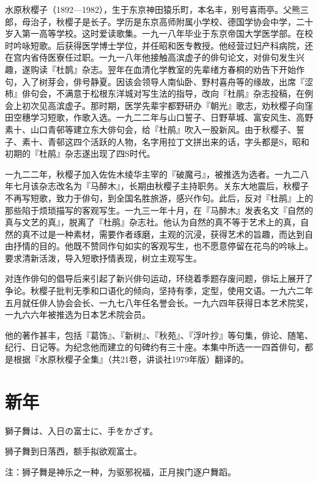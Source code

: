 {\FS
    水原秋樱子（1892—1982），生于东京神田猿乐町，本名丰，别号喜雨亭。父熊三郎，母治子，秋樱子是长子。学历是东京高师附属小学校、德国学协会中学，二十岁入第一高等学校。这时爱读歌集。一九一八年毕业于东京帝国大学医学部。在校时吟咏短歌。后获得医学博士学位，并任昭和医专教授。他经营过妇产科病院，还在宫内省侍医寮任过职。一九一八年他接触高滨虚子的俳句论文，对俳句发生兴趣，遂购读『杜鹊』杂志。翌年在血清化学教室的先辈绪方春桐的劝告下开始作句，入了树芽会，俳号静夏。因该会领导人南仙卧、野村喜舟等的缘故，出席『涩柿』俳句会，不满意于松根东洋城对写生法的指导，改向『杜鹃』杂志投稿，在例会上初次见高滨虚子。那时期，医学先辈宇都野研办『朝光』歌志，劝秋樱子向窪田空穗学习短歌，作歌入选。一九二二年与山口誓子、日野草城、富安风生、高野素十、山口青邨等建立东大俳句会，给『杜鹃』吹入一股新风。由于秋樱子、誓子、素十、青邨这四个活跃的人物，名字用拉丁文拼出来的话，字头都是S，昭和初期的『杜鹃』杂志遂出现了四S时代。

    一九二二年，秋樱子加入佐佐木绫华主宰的『破魔弓』，被推选为选者。一九二八年七月该杂志改名为『马醉木』，长期由秋樱子主持职务。关东大地震后，秋樱子不再写短歌，致力于俳句，到全国名胜旅游，感兴作句。此后，反对『杜鹃』上的那些陷于烦琐描写的客观写生。一九三一年十月，在『马醉木』发表名文『自然的真与文艺的真』，脱离了『杜鹃』杂志社。他认为自然的真不等于艺术上的真，自然的真不过是一种素材，需要作者琢磨，主观的沉浸，获得艺术的旨趣，而达到自由抒情的目的。他既不赞同作句如实的客观写生，也不愿意停留在花鸟的吟咏上。要求清新活泼，导入短歌抒情表现，树立主观写生。

    对连作俳句的倡导后来引起了新兴俳句运动，环绕着季题存废问题，俳坛上展开了争论。秋樱子批判无季和口语化的倾向，坚持有季，定型，使用文语。一九六二年五月就任俳人协会会长、一九七八年任名誉会长。一九六四年获得日本艺术院奖，一九六六年被推选为日本艺术院会员。

    他的著作甚丰，包括『葛饰』、『新树』、『秋苑』、『浮叶抄』等句集，俳论、随笔、纪行、日记等。为纪念他而建立的句碑约有三十座。本集中所选一一四首俳句，都是根据『水原秋樱子全集』（共21卷，讲谈社1979年版）翻译的。
}

\newpage

\section{\FK 新年}

\setcounter{haikucounter}{0}

\begin{haiku}
    {\FH 獅子舞は、入日の富士に、手をかざす。}

    {\FK 狮子舞到日落西，额手拟欲观富士。}

    {\FT 注：狮子舞是神乐之一种，为驱邪祝福，正月挨门逐户舞蹈。}
\end{haiku}

